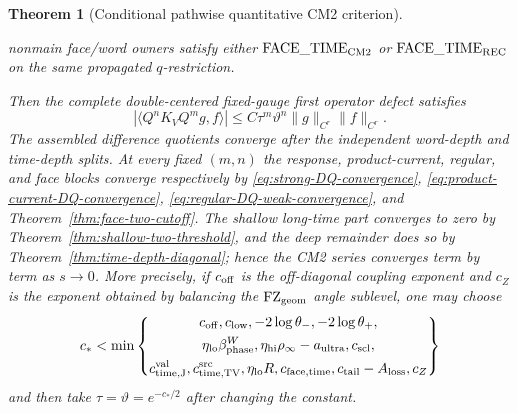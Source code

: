 \documentclass[11pt]{article}
\newtheorem{theorem}{Theorem}[section]
\begin{document}
\begin{theorem}[Conditional pathwise quantitative CM2 criterion]
\begin{enumerate}[label=\textup{(H\arabic*)}]
      nonmain face/word owners satisfy
      either $\mathrm{FACE\_TIME}_{\rm CM2}$ or
      $\mathrm{FACE\_TIME}_{\rm REC}$ on the same propagated
      $q$-restriction.
\end{enumerate}
Then the complete double-centered fixed-gauge first operator defect satisfies
\[
 |\langle Q^nK_VQ^mg,f\rangle|
 \le C\tau^m\vartheta^n\|g\|_{C^r}\|f\|_{C^r}.
\]
The assembled difference quotients converge after the independent word-depth
and time-depth splits.  At every fixed $(m,n)$ the response,
product-current, regular, and face blocks converge respectively by
\eqref{eq:strong-DQ-convergence},
\eqref{eq:product-current-DQ-convergence},
\eqref{eq:regular-DQ-weak-convergence}, and
Theorem~\ref{thm:face-two-cutoff}.  The shallow long-time part converges to zero by
Theorem~\ref{thm:shallow-two-threshold}, and the deep remainder does so by
Theorem~\ref{thm:time-depth-diagonal}; hence the CM2 series converges term by
term as $s\to0$.  More
precisely, if $c_{\rm off}$ is the off-diagonal coupling exponent and $c_Z$
is the exponent obtained by balancing the $\mathrm{FZ}_{\rm geom}$ angle sublevel, one
may choose
\begin{equation}
\label{eq:final-CM2-exponent}
 c_*<\min\left\{
 \begin{gathered}
 c_{\rm off},c_{\rm low},-2\log\theta_-,-2\log\theta_+,\\
 \eta_{\rm lo}\beta_{\rm phase}^{W},
 \eta_{\rm hi}\rho_\infty-a_{\rm ultra},c_{\rm scl},\\
 c_{\rm time,J}^{\rm val},c_{\rm time,TV}^{\rm src},
 \eta_{\rm lo}R,c_{\rm face,time},c_{\rm tail}-A_{\rm loss},c_Z
 \end{gathered}
 \right\}
\end{equation}
and then take $\tau=\vartheta=e^{-c_*/2}$ after changing the constant.
\end{theorem}
\end{document}
